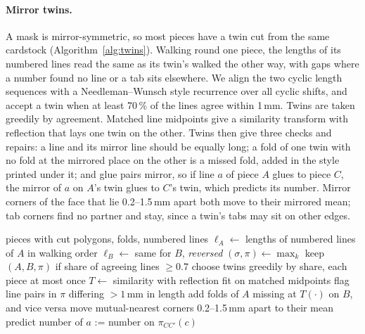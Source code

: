 \paragraph{Mirror twins.} A mask is mirror-symmetric, so most pieces have a twin cut from the
same cardstock (Algorithm~\ref{alg:twins}). Walking round one piece, the lengths of its numbered
lines read the same as its twin's walked the other way, with gaps where a number found no line
or a tab sits elsewhere. We align the two cyclic length sequences with a Needleman--Wunsch style
recurrence \cite{needleman1970} over all cyclic shifts, and accept a twin when at least 70\,\% of
the lines agree within 1\,mm. Twins are taken greedily by agreement. Matched line midpoints give
a similarity transform with reflection \cite{umeyama1991} that lays one twin on the other.
Twins then give three checks and repairs: a line and its mirror line should be equally long; a
fold of one twin with no fold at the mirrored place on the other is a missed fold, added in the
style printed under it; and glue pairs mirror, so if line $a$ of piece $A$ glues to piece $C$,
the mirror of $a$ on $A$'s twin glues to $C$'s twin, which predicts its number. Mirror corners
of the face that lie 0.2--1.5\,mm apart both move to their mirrored mean; tab corners find no
partner and stay, since a twin's tabs may sit on other edges.

\begin{algorithm}[t]
\caption{Mirror twins: matching, prediction, repair}
\label{alg:twins}
\begin{algorithmic}[1]
\Require pieces with cut polygons, folds, numbered lines
  \State $\ell_A \gets$ lengths of numbered lines of $A$ in walking order
  \State $\ell_B \gets$ same for $B$, \emph{reversed}
  \State $(\sigma, \pi) \gets \max_k$ 
  \Statex {}
  \State keep $(A,B,\pi)$ if share of agreeing lines $\ge 0.7$
\EndFor
\State choose twins greedily by share, each piece at most once
  \State $T \gets$ similarity with reflection fit on matched midpoints
  \State flag line pairs in $\pi$ differing $> 1$\,mm in length
  \State add folds of $A$ missing at $T(\cdot)$ on $B$, and vice versa
  \State move mutual-nearest corners 0.2--1.5\,mm apart to their mean
      \State predict number of $a$ := number on $\pi_{CC'}(c)$
    \EndIf
  \EndFor
\EndFor
\end{algorithmic}
\end{algorithm}

